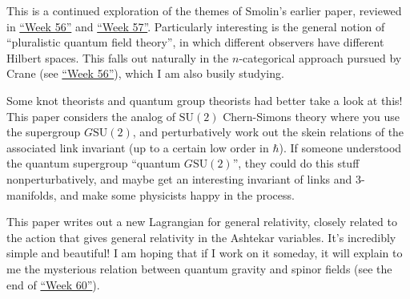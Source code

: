 \documentclass{article}
\def\tightlist{}
\renewcommand{\texttt}[1]{%
  \begingroup
  \ttfamily
  \begingroup\lccode`~=`/\lowercase{\endgroup\def~}{/\discretionary{}{}{}}%
  \begingroup\lccode`~=`[\lowercase{\endgroup\def~}{[\discretionary{}{}{}}%
  \begingroup\lccode`~=`.\lowercase{\endgroup\def~}{.\discretionary{}{}{}}%
  \catcode`/=\active\catcode`[=\active\catcode`.=\active
  \scantokens{#1\noexpand}%
  \endgroup
}
\begin{document}
This is a continued exploration of the themes of Smolin's earlier paper,
reviewed in \protect\hyperlink{week56}{``Week 56''} and
\protect\hyperlink{week57}{``Week 57''}. Particularly interesting is the
general notion of ``pluralistic quantum field theory'', in which
different observers have different Hilbert spaces. This falls out
naturally in the \(n\)-categorical approach pursued by Crane (see
\protect\hyperlink{week56}{``Week 56''}), which I am also busily
studying.


Some knot theorists and quantum group theorists had better take a look
at this! This paper considers the analog of \(\mathrm{SU}(2)\)
Chern-Simons theory where you use the supergroup \(G\mathrm{SU}(2)\),
and perturbatively work out the skein relations of the associated link
invariant (up to a certain low order in \(\hbar\)). If someone
understood the quantum supergroup ``quantum \(G\mathrm{SU}(2)\)'', they
could do this stuff nonperturbatively, and maybe get an interesting
invariant of links and 3-manifolds, and make some physicists happy in
the process.


This paper writes out a new Lagrangian for general relativity, closely
related to the action that gives general relativity in the Ashtekar
variables. It's incredibly simple and beautiful! I am hoping that if I
work on it someday, it will explain to me the mysterious relation
between quantum gravity and spinor fields (see the end of
\protect\hyperlink{week60}{``Week 60''}).

\end{document}
